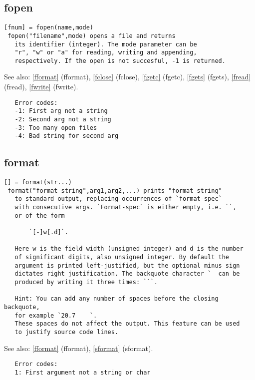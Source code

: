 \documentclass[a4paper]{article}
\begin{document}
\subsection{fopen\label{fopen}}

\begin{tscreen}
\begin{verbatim}
[fnum] = fopen(name,mode)
 fopen("filename",mode) opens a file and returns
   its identifier (integer). The mode parameter can be
   "r", "w" or "a" for reading, writing and appending,
   respectively. If the open is not succesful, -1 is returned.
\end{verbatim}

See also: \ref{fformat} {(fformat)}, \ref{fclose} {(fclose)}, \ref{fgetc} {(fgetc)}, \ref{fgets} {(fgets)}, \ref{fread} {(fread)}, \ref{fwrite} {(fwrite)}.
\begin{verbatim}
   Error codes:
   -1: First arg not a string
   -2: Second arg not a string
   -3: Too many open files
   -4: Bad string for second arg
\end{verbatim}
\end{tscreen}





\subsection{format\label{format}}

\begin{tscreen}
\begin{verbatim}
[] = format(str...)
 format("format-string",arg1,arg2,...) prints "format-string"
   to standard output, replacing occurrences of `format-spec`
   with consecutive args. `Format-spec` is either empty, i.e. ``,
   or of the form

       `[-]w[.d]`.

   Here w is the field width (unsigned integer) and d is the number
   of significant digits, also unsigned integer. By default the
   argument is printed left-justified, but the optional minus sign
   dictates right justification. The backquote character `  can be
   produced by writing it three times: ```.
   
   Hint: You can add any number of spaces before the closing backquote,
   for example `20.7    `.
   These spaces do not affect the output. This feature can be used
   to justify source code lines.
\end{verbatim}

See also: \ref{fformat} {(fformat)}, \ref{sformat} {(sformat)}.
\begin{verbatim}
   Error codes:
   1: First argument not a string or char 
\end{verbatim}
\end{tscreen}
\end{document}
